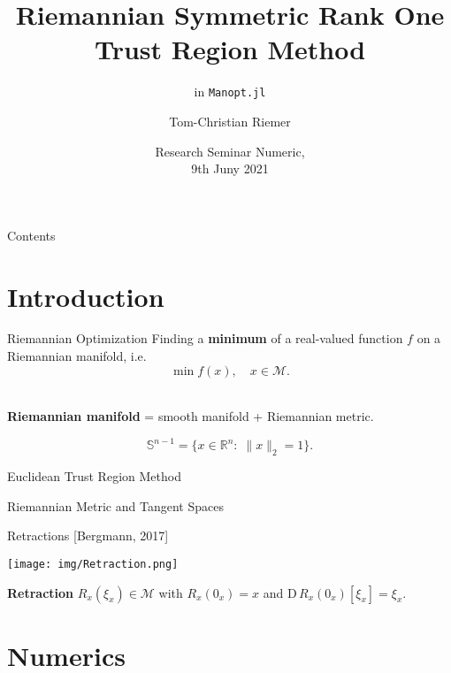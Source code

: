 \documentclass{beamer}
\title{Riemannian Symmetric Rank One Trust Region Method}
\subtitle{in \lstinline!Manopt.jl!}
\author{Tom-Christian Riemer}
\institute{TU Chemnitz}
\date{Research Seminar Numeric,\\ 9th Juny 2021}
\begin{document}
\maketitle

\begin{frame}{Contents}
	\tableofcontents
\end{frame}

\section{Introduction}

\begin{frame}{Riemannian Optimization}
    Finding a \textbf{minimum} of a real-valued function $f$ on a Riemannian manifold, i.e.
    \begin{equation*}
        \min f(x), \quad x \in \mathcal{M}.
    \end{equation*}\\[1.\baselineskip]
    \begin{center}
        \textbf{Riemannian manifold} = smooth manifold + Riemannian metric. \\[1.\baselineskip]
    \end{center}
    \begin{equation*}
        \mathbb{S}^{n-1} = \{ x \in \mathbb{R}^n \colon \; \lVert x \rVert_2 = 1 \}.
    \end{equation*}
\end{frame}

\begin{frame}{Euclidean Trust Region Method}
    
\end{frame}

\begin{frame}{Riemannian Metric and Tangent Spaces}
    
\end{frame}

\begin{frame}{Retractions}
    \vspace{-1\baselineskip}\hfill{\tiny{[Bergmann, 2017]}}
    \begin{center}
        \texttt{[image: img/Retraction.png]}
    \end{center}
    \textbf{Retraction} $R_{x}(\xi_x) \in \mathcal{M}$ with $R_x (0_x) = x$ and $\mathrm{D} \, R_x (0_x)[\xi_x] = \xi_x$.
\end{frame}

\section{Numerics}
\end{document}
